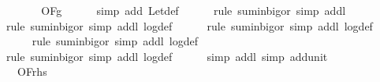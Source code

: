 \begin{isabellebody}
\ \ \isamarkupfalse%
\ \isamarkupfalse%
\ {\isachardoublequoteopen}{\isachardot}{\kern0pt}{\isachardot}{\kern0pt}{\isachardot}{\kern0pt}\ {\isasymin}\ O{\isacharbrackleft}{\kern0pt}{\isacharquery}{\kern0pt}F{\isacharbrackright}{\kern0pt}{\isacharparenleft}{\kern0pt}g{\isacharparenright}{\kern0pt}{\isachardoublequoteclose}\isanewline
\ \ \ \ \isamarkupfalse%
\ {\isacharparenleft}{\kern0pt}simp\ add{\isacharcolon}{\kern0pt}\ Let{\isacharunderscore}{\kern0pt}def{\isacharparenright}{\kern0pt}\isanewline
\ \ \ \ \isamarkupfalse%
\ {\isacharparenleft}{\kern0pt}rule\ sum{\isacharunderscore}{\kern0pt}in{\isacharunderscore}{\kern0pt}bigo{\isacharunderscore}{\kern0pt}r{\isacharcomma}{\kern0pt}\ simp\ add{\isacharcolon}{\kern0pt}l{}{\isacharparenright}{\kern0pt}\isanewline
\ \ \ \ \isamarkupfalse%
\ {\isacharparenleft}{\kern0pt}rule\ sum{\isacharunderscore}{\kern0pt}in{\isacharunderscore}{\kern0pt}bigo{\isacharunderscore}{\kern0pt}r{\isacharcomma}{\kern0pt}\ simp\ add{\isacharcolon}{\kern0pt}l{}\ log{\isacharunderscore}{\kern0pt}def{\isacharparenright}{\kern0pt}\isanewline
\ \ \ \ \isamarkupfalse%
\ {\isacharparenleft}{\kern0pt}rule\ sum{\isacharunderscore}{\kern0pt}in{\isacharunderscore}{\kern0pt}bigo{\isacharunderscore}{\kern0pt}r{\isacharcomma}{\kern0pt}\ simp\ add{\isacharcolon}{\kern0pt}l{}\ log{\isacharunderscore}{\kern0pt}def{\isacharparenright}{\kern0pt}\isanewline
\ \ \ \ \isamarkupfalse%
\ {\isacharparenleft}{\kern0pt}rule\ sum{\isacharunderscore}{\kern0pt}in{\isacharunderscore}{\kern0pt}bigo{\isacharunderscore}{\kern0pt}r{\isacharcomma}{\kern0pt}\ simp\ add{\isacharcolon}{\kern0pt}l{}\ log{\isacharunderscore}{\kern0pt}def{\isacharparenright}{\kern0pt}\isanewline
\ \ \ \ \isamarkupfalse%
\ {\isacharparenleft}{\kern0pt}rule\ sum{\isacharunderscore}{\kern0pt}in{\isacharunderscore}{\kern0pt}bigo{\isacharunderscore}{\kern0pt}r{\isacharcomma}{\kern0pt}\ simp\ add{\isacharcolon}{\kern0pt}l{}\ log{\isacharunderscore}{\kern0pt}def{\isacharparenright}{\kern0pt}\isanewline
\ \ \ \ \isamarkupfalse%
\ {\isacharparenleft}{\kern0pt}simp\ add{\isacharcolon}{\kern0pt}l{}{\isacharcomma}{\kern0pt}\ simp\ add{\isacharcolon}{\kern0pt}unit{\isacharunderscore}{\kern0pt}{}{\isacharparenright}{\kern0pt}\isanewline
\ \ \isamarkupfalse%
\ \isamarkupfalse%
\ {\isachardoublequoteopen}{\isachardot}{\kern0pt}{\isachardot}{\kern0pt}{\isachardot}{\kern0pt}\ {\isacharequal}{\kern0pt}\ O{\isacharbrackleft}{\kern0pt}{\isacharquery}{\kern0pt}F{\isacharbrackright}{\kern0pt}{\isacharparenleft}{\kern0pt}{\isacharquery}{\kern0pt}rhs{\isacharparenright}{\kern0pt}{\isachardoublequoteclose}\isanewline

\end{isabellebody}

